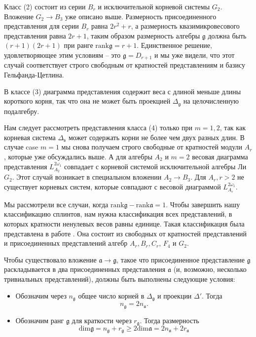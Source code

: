 \documentclass[12pt]{article}
\newcommand{\gf}{\mathfrak{g}}
\newcommand{\af}{\mathfrak{a}}
\newcommand{\sfr}{\mathfrak{s}}
\begin{document}

Класс (2) состоит из серии  $B_{r}$ и исключительной корневой системы $G_{2}$. Вложение  $G_{2}\to
B_{3}$ уже описано выше. Размерность присоединенного представления для серии $B_{r}$ равна
$2r^{2}+r$, а размерность квазимикровесового представления равна $2r+1$, таким образом размерность
алгебры 
$\gf$ должна быть $(r+1)(2r+1)$ при ранге $\mathrm{rank}\gf=r+1$. Единственное решение,
удовлетворяющее этим условиям -- это  $\gf=D_{r+1}$ и мы уже видели, что этот случай соответствует
строго свободным от кратностей представлениям и базису Гельфанда-Цетлина.

В классе  (3) диаграмма представления содержит веса с длиной меньше длины короткого корня, так что
она не может быть проекцией  $\Delta_{\gf}$ на целочисленную подалгебру.

Нам следует рассмотреть представления класса  (4) только при $m=1,2$, так как корневая система
$\Delta_{\sfr}$ может содержать корни не более чем двух разных длин. В случае case $m=1$ мы снова
получаем строго свободные от кратностей модули $A_{r}$, которые уже обсуждались выше. А для алгебры
$A_{2}$ и $m=2$ весовая диаграмма представления $L^{2\omega_{1}}_{A_{2}}$ совпадает с корневой
системой исключительной алгебры Ли
$G_{2}$. Этот случай возникает в специальном вложении  $A_{2}\to B_{3}$. Для $A_{r}, r>2$ не
существует корневых систем, которые совпадают с весовой диаграммой $L^{2\omega_{1}}_{A_{r}}$. 

Мы рассмотрели все случаи, когда $\mathrm{rank}\gf-\mathrm{rank}\af=1$. Чтобы завершить нашу
классификацию сплинтов, нам нужна классификация всех представлений, в которых кратности ненулевых
весов равны единице. Такая классификация была представлена в работе
\cite{plotkin1998visual}. Она состоит из свободных от кратностей представлений и присоединенных
представлений алгебр  $A_{r}, B_{r}, C_{r}$, $F_{4}$ и $G_{2}$. 

Чтобы существовало вложение $\af\to \gf$, такое что присоединенное представление  $\gf$
раскладывается в два присоединенных представления $\af$ (и, возможно, несколько тривиальных
представлений), должны быть выполнены следующие условия:
\begin{itemize}
\item Обозначим через $n_{\gf}$ общее число корней в  $\Delta_{\gf}$ и проекции $\Delta'$.
  Тогда
  \begin{equation}
    \label{eq:5}
    n_{\gf}=2n_{\af}.
  \end{equation}
\item Обозначим ранг $\gf$ для краткости через $r_{\gf}$. Тогда размерность
  \begin{equation}
    \label{eq:6}
    \mathrm{dim}\gf=n_{\gf}+r_{\gf}\geq 2\mathrm{dim}\af=2n_{\af}+2r_{\af}
  \end{equation}

\end{itemize}
\end{document}
